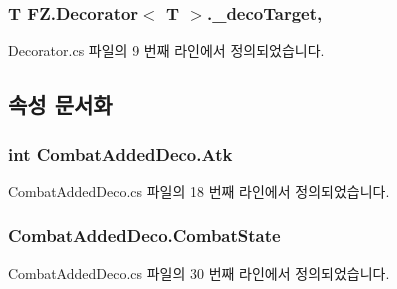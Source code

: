 \subsubsection[{\texorpdfstring{\+\_\+deco\+Target}{_decoTarget}}]{\setlength{\rightskip}{0pt plus 5cm}T {\bf F\+Z.\+Decorator}$<$ T $>$.\+\_\+deco\+Target\hspace{0.3cm}{\ttfamily [protected]}, {\ttfamily [inherited]}}\hypertarget{class_f_z_1_1_decorator_adce2c6d288dcfa08b899f3e233190210}{}\label{class_f_z_1_1_decorator_adce2c6d288dcfa08b899f3e233190210}


Decorator.\+cs 파일의 9 번째 라인에서 정의되었습니다.



\subsection{속성 문서화}
\subsubsection[{\texorpdfstring{Atk}{Atk}}]{\setlength{\rightskip}{0pt plus 5cm}int Combat\+Added\+Deco.\+Atk\hspace{0.3cm}{\ttfamily [get]}}\hypertarget{class_combat_added_deco_aeb5992435525404a992ee9f028a2cf0d}{}\label{class_combat_added_deco_aeb5992435525404a992ee9f028a2cf0d}


Combat\+Added\+Deco.\+cs 파일의 18 번째 라인에서 정의되었습니다.

\subsubsection[{\texorpdfstring{Combat\+State}{CombatState}}]{ Combat\+Added\+Deco.\+Combat\+State\hspace{0.3cm}{\ttfamily [get]}}\hypertarget{class_combat_added_deco_a16e7a3ae7dc8751d25ef0b6ee0ce5531}{}\label{class_combat_added_deco_a16e7a3ae7dc8751d25ef0b6ee0ce5531}


Combat\+Added\+Deco.\+cs 파일의 30 번째 라인에서 정의되었습니다.

